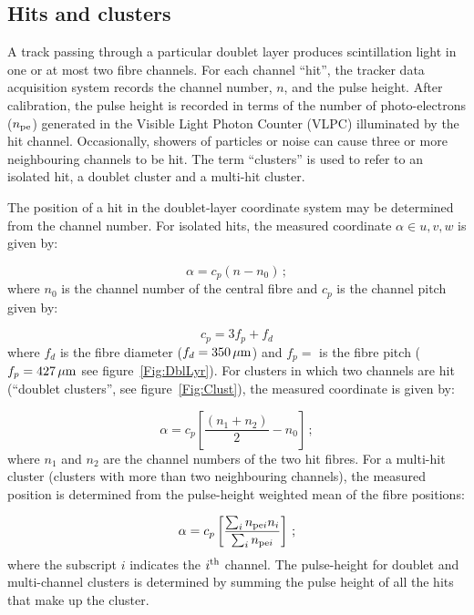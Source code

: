 \subsection{Hits and clusters}
\label{SubSect:SciFiHtsClstrs}

A track passing through a particular doublet layer produces scintillation light in one or at most two fibre channels. For each channel ``hit'', the tracker data acquisition system records the channel number, $n$, and the pulse height. After calibration, the pulse height is recorded in terms of the number of photo-electrons ($n_{\rm pe}$) generated in the Visible Light Photon Counter (VLPC) illuminated by the hit channel. Occasionally, showers of particles or noise can cause three or more neighbouring channels to be hit. The term ``clusters'' is used to refer to an isolated hit, a doublet cluster and a multi-hit cluster.

The position of a hit in the doublet-layer coordinate system may be determined from the channel number. For isolated hits, the measured coordinate $\alpha \in {u, v, w}$ is given by:

\begin{equation}
  \alpha = c_p (n - n_0)\,;
\end{equation}
where $n_0$ is the channel number of the central fibre and $c_p$ is the channel pitch given by:

\begin{equation}
  c_p = 3f_p + f_d
\end{equation}
where $f_d$ is the fibre diameter ($f_d = 350\,\mu{\rm m}$) and $f_p = $ is the fibre pitch ($f_p = 427\,\mu{\rm m}$ see figure~\ref{Fig:DblLyr}). For clusters in which two channels are hit (``doublet clusters'', see figure~\ref{Fig:Clust}), the measured coordinate is given by:

\begin{equation}
  \alpha = c_p \left[ \frac{( n_1 + n_2)}{2} - n_0 \right]\,;
\end{equation}
where $n_1$ and $n_2$ are the channel numbers of the two hit fibres. For a multi-hit cluster (clusters with more than two neighbouring channels), the measured position is determined from the pulse-height weighted mean of the fibre positions:

\begin{equation}
  \alpha = c_p \left[ 
                 \frac{\sum_i n_{{\rm pe}i}n_i}{\sum_i n_{{\rm pe}i}} 
               \right]\,;
\end{equation}
where the subscript $i$ indicates the $i^{\rm th}$ channel. The pulse-height for doublet and multi-channel clusters is determined by summing the pulse height of all the hits that make up the cluster.

